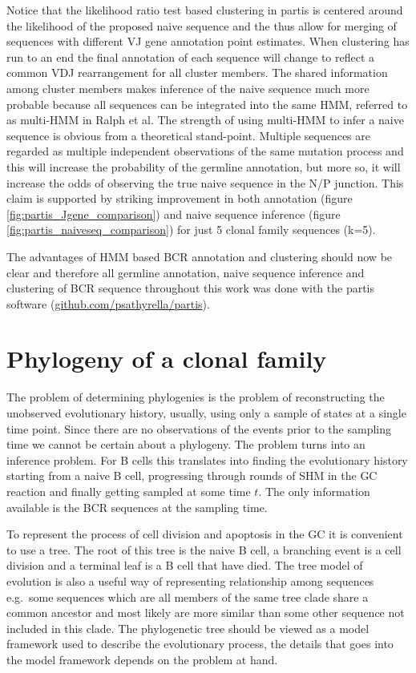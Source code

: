 Notice that the likelihood ratio test based clustering in partis is centered around the likelihood of the proposed naive sequence and the thus allow for merging of sequences with different VJ gene annotation point estimates.
When clustering has run to an end the final annotation of each sequence will change to reflect a common VDJ rearrangement for all cluster members.
The shared information among cluster members makes inference of the naive sequence much more probable because all sequences can be integrated into the same HMM, referred to as multi-HMM in Ralph et al.
The strength of using multi-HMM to infer a naive sequence is obvious from a theoretical stand-point.
Multiple sequences are regarded as multiple independent observations of the same mutation process and this will increase the probability of the germline annotation, but more so, it will increase the odds of observing the true naive sequence in the N/P junction.
This claim is supported by striking improvement in both annotation (figure \ref{fig:partis_Jgene_comparison}) and naive sequence inference (figure \ref{fig:partis_naiveseq_comparison}) for just 5 clonal family sequences (k=5).

The advantages of HMM based BCR annotation and clustering should now be clear and therefore all germline annotation, naive sequence inference and clustering of BCR sequence throughout this work was done with the partis software (\url{github.com/psathyrella/partis}).











\section{Phylogeny of a clonal family}
The problem of determining phylogenies is the problem of reconstructing the unobserved evolutionary history, usually, using only a sample of states at a single time point.
Since there are no observations of the events prior to the sampling time we cannot be certain about a phylogeny.
The problem turns into an inference problem.
For B cells this translates into finding the evolutionary history starting from a naive B cell, progressing through rounds of SHM in the GC reaction and finally getting sampled at some time $t$.
The only information available is the BCR sequences at the sampling time.

To represent the process of cell division and apoptosis in the GC it is convenient to use a tree.
The root of this tree is the naive B cell, a branching event is a cell division and a terminal leaf is a B cell that have died.
The tree model of evolution is also a useful way of representing relationship among sequences e.g.\ some sequences which are all members of the same tree clade share a common ancestor and most likely are more similar than some other sequence not included in this clade.
The phylogenetic tree should be viewed as a model framework used to describe the evolutionary process, the details that goes into the model framework depends on the problem at hand.



